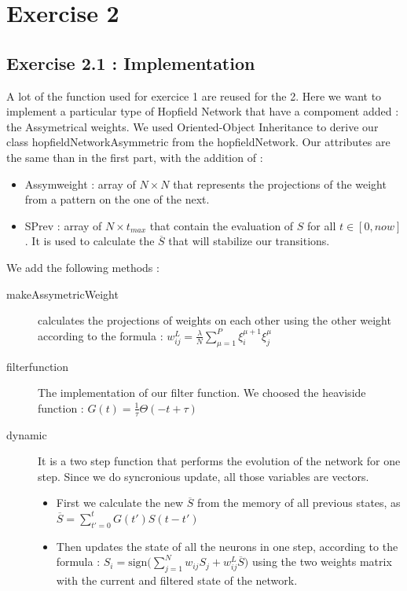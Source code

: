 \section{Exercise 2}

\subsection{Exercise 2.1 : Implementation}
A lot of the function used for exercice 1 are reused for the 2. Here we want to 
implement a particular type of Hopfield Network that have a compoment added : the Assymetrical 
weights. We used Oriented-Object Inheritance to derive our class hopfieldNetworkAsymmetric
from the hopfieldNetwork. Our attributes are the same than in the first part, with the addition
of :
\begin{itemize}
\item Assymweight : array of $N\times N$ that represents the projections of the weight from a 
pattern on the one of the next.
\item SPrev : array of $N \times t_{max}$ that contain the evaluation of $S$ for all $t \in
 [0, now]$. It is used to calculate the $\overline{S}$ that will stabilize our transitions.
\end{itemize}

We add the following methods :
\begin{description}
\item [makeAssymetricWeight] calculates the projections of weights 
on each other using the other weight according to the formula : 
$w_{ij}^L = \frac{\lambda}{N}\sum_{\mu=1}^P \xi_i^{\mu+1} \xi_j^{\mu}$
\item [filterfunction] The implementation of our filter function. We choosed the heaviside function : $G(t) = \frac{1}{\tau} \Theta (-t + \tau)$
\item[dynamic] It is a two step function that performs the evolution of the network for one step. Since we do syncronious update, all those variables are vectors. \\
\begin{itemize}  
    \item First we calculate the new  $\overline{S}$ from the memory of all previous states, as $\overline{S} = \sum_{t'=0}^{t} G(t')S(t-t')$
    \item Then updates the state of all the neurons in one step, 
according to the formula : $S_i = \textrm{sign}\big(\sum_{j=1}^N w_{ij}S_j + w_{ij}^L\overline{S} \big)$ using the
two weights matrix with the current and filtered state of the network. 
\end{itemize}
\end{description}


